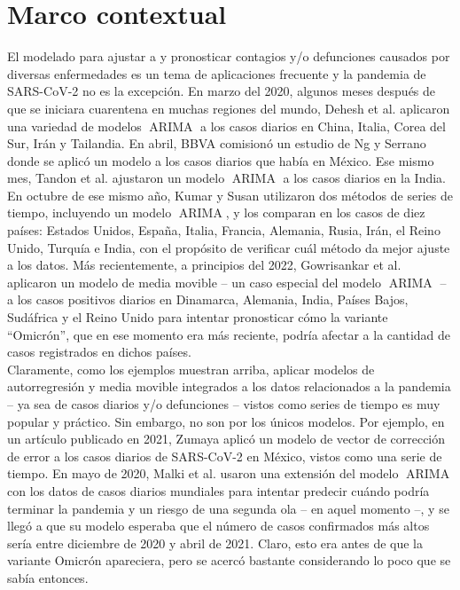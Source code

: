 \documentclass[11pt,letterpaper]{article}
\newcommand{\ARIMA}{\ensuremath{\operatorname{ARIMA}}}
\theoremstyle{definition}
\theoremstyle{theorem}
\theoremstyle{remark}
\begin{document}
	\section{Marco contextual}
	\noindent\justify El modelado para ajustar a y pronosticar contagios y/o defunciones causados por diversas enfermedades es un tema de aplicaciones frecuente y la pandemia de SARS-CoV-2 no es la excepción. En marzo del 2020, algunos meses después de que se iniciara cuarentena en muchas regiones del mundo, Dehesh et al.\cite{dehesh2020forecasting} aplicaron una variedad de modelos \(\ARIMA\) a los casos diarios en China, Italia, Corea del Sur, Irán y Tailandia. En abril, BBVA comisionó un estudio de Ng y Serrano\cite{ng2020mexico} donde se aplicó un modelo a los casos diarios que había en México. Ese mismo mes, Tandon et al.\cite{tandon2020coronavirus} ajustaron un modelo \(\ARIMA\) a los casos diarios en la India. En octubre de ese mismo año, Kumar y Susan\cite{kumar2020covid} utilizaron dos métodos de series de tiempo, incluyendo un modelo \(\ARIMA\), y los comparan en los casos de diez países: Estados Unidos, España, Italia, Francia, Alemania, Rusia, Irán, el Reino Unido, Turquía e India, con el propósito de verificar cuál método da mejor ajuste a los datos. Más recientemente, a principios del 2022, Gowrisankar et al.\cite{gowrisankar2022omicron} aplicaron un modelo de media movible -- un caso especial del modelo \(\ARIMA\) -- a los casos positivos diarios en Dinamarca, Alemania, India, Países Bajos, Sudáfrica y el Reino Unido para intentar pronosticar cómo la variante ``Omicrón'', que en ese momento era más reciente, podría afectar a la cantidad de casos registrados en dichos países. \\
	\indent Claramente, como los ejemplos muestran arriba, aplicar modelos de autorregresión y media movible integrados a los datos relacionados a la pandemia -- ya sea de casos diarios y/o defunciones -- vistos como series de tiempo es muy popular y práctico. Sin embargo, no son por los únicos modelos. Por ejemplo, en un artículo publicado en 2021, Zumaya\cite{zumaya2021expansion} aplicó un modelo de vector de corrección de error a los casos diarios de SARS-CoV-2 en México, vistos como una serie de tiempo. En mayo de 2020, Malki et al.\cite{malki2021arima} usaron una extensión del modelo \(\ARIMA\) con los datos de casos diarios mundiales para intentar predecir cuándo podría terminar la pandemia y un riesgo de una segunda ola -- en aquel momento --, y se llegó a que su modelo esperaba que el número de casos confirmados más altos sería entre diciembre de 2020 y abril de 2021. Claro, esto era antes de que la variante Omicrón apareciera, pero se acercó bastante considerando lo poco que se sabía entonces.
	\clearpage
\end{document}
